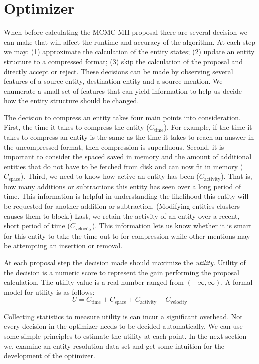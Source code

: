 \section{Optimizer}
\label{sec:optimizer:optimizer}

When before calculating the MCMC-MH proposal there are several decision we can make
that will affect the runtime and accuracy of the algorithm.
At each step we may:
  (1) approximate the calculation of the entity states;
  (2) update an entity structure to a compressed format;
  (3) skip the calculation of the proposal and directly accept or reject.
These decisions can be made by observing several features of a source entity,
destination entity and a source mention.
We enumerate a small set of features that can yield information to
help us decide how the entity structure should be changed.

The decision to compress an entity takes
four main points into consideration. First, the time it takes to compress
the entity ($ C_\text{time}$).
For example, if the time it takes to compress an entity is the same as the time it takes to
reach an answer in the uncompressed format, then compression is superfluous.
Second, it is important to consider the spaced saved in memory and the amount of 
additional entities that do not have to be fetched from disk and can now fit in memory ($C_\text{space}$).
Third, we need to know how active an entity has been ($C_\text{activity}$).
That is, how many additions or subtractions this entity has seen over a long period of time.
This information is helpful in understanding the likelihood this entity will be requested
for another addition or subtraction.
(Modifying entities clusters causes them to block.)
Last, we retain the activity of an entity over a recent, short period of time
($C_\text{velocity}$). This information lets us know whether it is smart for
this entity to take the time out to for compression while other mentions may be
attempting an insertion or removal.

At each proposal step the decision made should maximize the \textit{utility}.
Utility of the decision is a numeric score to represent the gain performing
the proposal calculation. The utility value is a real number ranged from $( -\infty, \infty)$.
A formal model for utility is as follows:
\[
U = C_\text{time} + C_\text{space} + C_\text{activity} + C_\text{velocity}
\]

Collecting statistics to measure utility is can incur a significant overhead.
Not every decision in the optimizer needs to be decided automatically.
We can use some simple principles to estimate the utility at each point.
In the next section we, examine an entity resolution data set and get some
intuition for the development of the optimizer.





